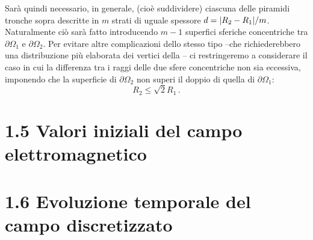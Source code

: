 Sarà quindi necessario, in generale,  (cioè suddividere) ciascuna delle piramidi tronche sopra descritte in $m$ strati di uguale spessore $d  = \abs{R_2 - R_1}/m$. Naturalmente ciò sarà fatto introducendo $m-1$ superfici sferiche concentriche tra        
$\partial \Omega_1$ e $\partial \Omega_2$. Per evitare altre complicazioni dello stesso tipo --che richiederebbero una distribuzione più elaborata dei vertici della -- ci restringeremo a considerare il caso in cui la differenza tra i raggi delle due sfere concentriche non sia eccessiva, imponendo che la superficie di $\partial \Omega_2$ non superi il doppio di quella di $\partial \Omega_1$:  
$$R_2 \leq \sqrt{2} R_1\,.$$   


\section*{1.5 Valori iniziali del campo elettromagnetico}\label{sec_1.5}


\section*{1.6 Evoluzione temporale del campo discretizzato}\label{sec_1.6}

